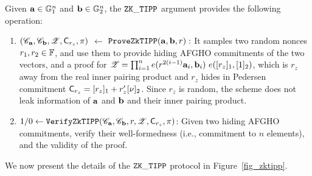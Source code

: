 \begin{definition}\label{zk_tipp}
 Given ${{\mathbf {a}}} \in {\mathbb{G}}_1^n$ and ${{\mathbf {b}}} \in {\mathbb{G}}_2^n$, the
 ${\mathtt{ZK\_TIPP}}$ argument provides the following operation:

\begin{enumerate}
\item
 $({\mathscr{C}}_{{\mathbf {a}}}, {\mathscr{C}}_{{\mathbf {b}}}, {\mathscr{Z}}, {\mathsf{C}}_{r_z}, \pi)$
   $\leftarrow$ ${\mathtt{ProveZkTIPP}}({{\mathbf {a}}}, {{\mathbf {b}}}, r):$ \newline
   It samples two random nonces $r_1, r_2 \in \mathbb{F}$, and use them to
   provide hiding AFGHO commitments of the two vectors,
   and a proof for ${\mathscr{Z}} = \prod_{i=1}^n e(r^{2(i-1)}{{\mathbf {a}}}_i, {{\mathbf {b}}}_i)
   ~ e([r_z]_1, [1]_2)$, which is $r_z$ away from the real
   inner pairing product and $r_z$ hides in Pedersen commitment
   ${\mathsf{C}}_{r_z} = [r_z]_1 + r_z'[\nu]_2$.  Since $r_z$ is random,
   the scheme does not leak information of ${{\mathbf {a}}}$ and ${{\mathbf {b}}}$
   and their inner pairing product.

\item
 $1/0 \leftarrow {\mathtt{VerifyZkTIPP}}({\mathscr{C}}_{{{\mathbf {a}}}}, {\mathscr{C}}_{{{\mathbf {b}}}}, r, {\mathscr{Z}}, {\mathsf{C}}_{r_z}, \pi)$: \newline
 Given two hiding AFGHO commitments, verify their well-formedness (i.e.,
 commitment to $n$ elements), and the validity of the proof.
\end{enumerate}
\end{definition}




We now present the details of the ${\mathtt{ZK\_TIPP}}$ protocol in
Figure\ \ref{fig_zktipp}.

